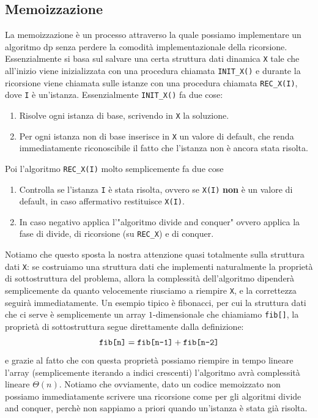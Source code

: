 \documentclass[11pt]{scrartcl}
\newcommand{\bigtheta}[1]{\Theta\!\left(#1\right)}
\begin{document}
	\subsection{Memoizzazione}
	
	La memoizzazione è un processo attraverso la quale possiamo implementare un algoritmo dp senza perdere la comodità implementazionale della ricorsione. Essenzialmente si basa sul salvare una certa struttura dati dinamica \verb*|X| tale che all'inizio viene inizializzata con una procedura chiamata \verb*|INIT_X()| e durante la ricorsione viene chiamata sulle istanze con una procedura chiamata \verb*|REC_X(I)|, dove \verb*|I| è un'istanza.
	Essenzialmente \verb*|INIT_X()| fa due cose:
	\begin{enumerate}
		\item Risolve ogni istanza di base, scrivendo in \verb*|X| la soluzione. 
		\item Per ogni istanza non di base inserisce in \verb*|X| un valore di default, che renda immediatamente riconoscibile il fatto che l'istanza non è ancora stata risolta.
	\end{enumerate}
	Poi l'algoritmo \verb*|REC_X(I)| molto semplicemente fa due cose
	\begin{enumerate}
		\item Controlla se l'istanza \verb*|I| è stata risolta, ovvero se \verb*|X(I)| \textbf{non} è un valore di default, in caso affermativo restituisce \verb*|X(I)|.
		\item In caso negativo applica l'"algoritmo divide and conquer" ovvero applica la fase di divide, di ricorsione (su \verb*|REC_X|) e di conquer.
	\end{enumerate}
	Notiamo che questo sposta la nostra attenzione quasi totalmente sulla struttura dati \verb*|X|: se costruiamo una struttura dati che implementi naturalmente la proprietà di sottostruttura del problema, allora la complessità dell'algoritmo dipenderà semplicemente da quanto velocemente riusciamo a riempire \verb*|X|, e la correttezza seguirà immediatamente. Un esempio tipico è fibonacci, per cui la struttura dati che ci serve è semplicemente un array $1$-dimensionale che chiamiamo \verb*|fib[]|, la proprietà di sottostruttura segue direttamente dalla definizione:
	$$\verb*|fib[n]|=\verb*|fib[n-1]|+\verb*|fib[n-2]|$$
	e grazie al fatto che con questa proprietà possiamo riempire in tempo lineare l'array (semplicemente iterando a indici crescenti) l'algoritmo avrà complessità lineare $\bigtheta{n}$. Notiamo che ovviamente, dato un codice memoizzato non possiamo immediatamente scrivere una ricorsione come per gli algoritmi divide and conquer, perchè non sappiamo a priori quando un'istanza è stata già risolta. \\
\end{document}
